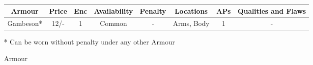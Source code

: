 \documentclass[parskip=full,11pt]{wfrp-short}
\begin{document}
\begin{figure*}[b]
    \begin{tcolorbox}[standard jigsaw, colback=yellow!5!orange, opacityback=.25, boxrule=0pt]
    \caption{Armour}
    \centering
    \begin{tabu}{c|c|c|c|c|c|c|c}
        \rowfont{\bfseries} Armour & Price & Enc & Availability &
            Penalty & Locations & APs & Qualities and Flaws\\
        \hline
        Gambeson* & 12/- & 1 & Common & - & Arms, Body & 1 & -\\
    \end{tabu}
		\newline \newline
		* Can be worn without penalty under any other Armour
    \end{tcolorbox}
\end{figure*}
\end{document}
